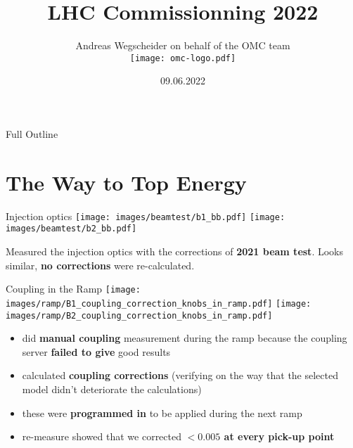 \documentclass[11pt,usenames,dvipsnames,aspectratio=169]{beamer}
\author[OMC]{%
Andreas Wegscheider on behalf of the OMC team\\%
\centering%
\texttt{[image: omc-logo.pdf]}%
}
\title[LHC 2022]{LHC Commissionning 2022}
\institute{CERN}
\date[09.06.22]{09.06.2022}
\newcommand{\highl}[1]{\textbf{#1}}
\begin{document}
\begin{frame}
    \titlepage
\end{frame}


\begin{frame}{Full Outline}
\tableofcontents
\end{frame}


\small

\section{The Way to Top Energy}



\begin{frame}{Injection optics}
    \texttt{[image: images/beamtest/b1\_bb.pdf]}
    \hfill
    \texttt{[image: images/beamtest/b2\_bb.pdf]}
    
    Measured the injection optics with the corrections of \highl{2021 beam test}.
    Looks similar, \highl{no corrections} were re-calculated.
\end{frame}




\begin{frame}{Coupling in the Ramp}
    \texttt{[image: images/ramp/B1\_coupling\_correction\_knobs\_in\_ramp.pdf]}
    \hfill
    \texttt{[image: images/ramp/B2\_coupling\_correction\_knobs\_in\_ramp.pdf]}
    
    \begin{itemize}
        \item %
            did \highl{manual coupling} measurement during the ramp because the coupling server
            \highl{failed to give} good results 
        \item %
            calculated \highl{coupling corrections} (verifying on the way that the selected model didn't deteriorate the calculations)
        \item %
            these were \highl{programmed in} to be applied during the next ramp
        \item %
            re-measure showed that we corrected \highl{$< 0.005$ at every pick-up point}
    \end{itemize}
\end{frame}


\end{document}
